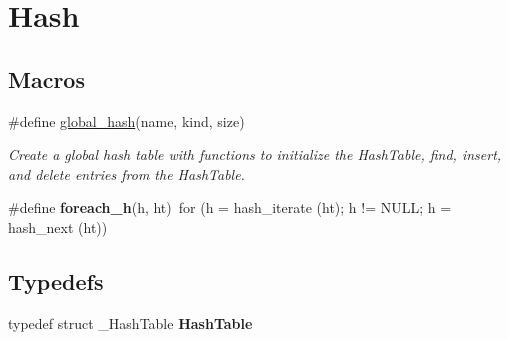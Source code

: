 \hypertarget{group__hash}{}\section{Hash}
\label{group__hash}
\subsection*{Macros}
\begin{DoxyCompactItemize}
\item 
\#define \hyperlink{group__hash_gadf905560217c8abc03d84eded54180e6}{global\+\_\+hash}(name,  kind,  size)
\begin{DoxyCompactList}\small\item\em Create a global hash table with functions to initialize the Hash\+Table, find, insert, and delete entries from the Hash\+Table. \end{DoxyCompactList}\item 
\mbox{\label{group__hash_ga6a684eeb68fe78419c0354cb07a1d191}} 
\#define {\bfseries foreach\+\_\+h}(h,  ht)~for (h = hash\+\_\+iterate (ht); h != N\+U\+LL; h = hash\+\_\+next (ht))
\end{DoxyCompactItemize}
\subsection*{Typedefs}
\begin{DoxyCompactItemize}
\item 
\mbox{\label{group__hash_gad09c371a5dda2decb59db772786a842a}} 
typedef struct \+\_\+\+Hash\+Table {\bfseries Hash\+Table}
\end{DoxyCompactItemize}
